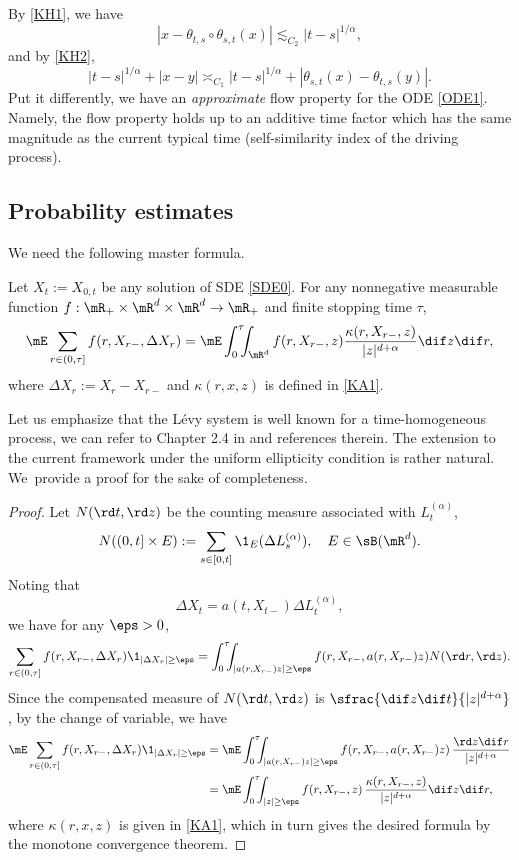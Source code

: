 \begin{remark}
By \eqref{KH1}, we have
\begin{equation*}%
|x-\theta_{t,s}\circ\theta_{s,t}(x)|\lesssim_{C_2} |t-s|^{1/\alpha},
\end{equation*}
and by \eqref{KH2},
\begin{equation}\label{KH22}
|t-s|^{1/\alpha}+|x-y|\asymp_{C_1}|t-s|^{1/\alpha}+|\theta_{s,t}(x)-\theta_{t,s}(y)|.
\end{equation}
Put it differently, we have an \textit{approximate} flow property for the ODE \eqref{ODE1}. Namely, the flow property holds up to an additive time factor which has the same magnitude as the current typical time (self-similarity index of the driving process).
\end{remark}
\subsection{Probability estimates}

We need the following master formula.
\begin{lemma}\label{Le24}
Let $X_t:=X_{0,t}$ be any solution of SDE \eqref{SDE0}.
For any nonnegative measurable function $f: \mR_+\times\mR^d\times\mR^d\to\mR_+$ and finite stopping time $\tau$,
\[
\mE\sum_{r\in(0,\tau]}f(r, X_{r-}, \Delta X_r)=\mE\int^\tau_0\!\!\!\int_{\mR^d}f(r, X_{r-}, z)\frac{\kappa(r,X_{r-},z)}{|z|^{d+\alpha}}\dif z\dif r,
\]
where $\Delta X_r:=X_r-X_{r-}$ and $\kappa(r,x,z)$ is defined in \eqref{KA1}.
\end{lemma}
Let us emphasize that the Lévy system is well known for a time-homogeneous process, we can \eg refer to Chapter 2.4 in \cite{bott:schi:wang:13} and references therein. The extension to the current framework under the uniform ellipticity condition is rather natural. We~provide a proof for the sake of completeness.
\begin{proof}
Let $N(\rd t,\rd z)$ be the counting measure associated with $L^{(\alpha)}_t$, \ie
\[
N((0,t]\times E):=\sum_{s\in[0,t]}\1_E(\Delta L^{(\alpha)}_s),\quad E\in\sB(\mR^d).
\]
Noting that
\[
\Delta X_t=a(t,X_{t-})\Delta L^{(\alpha)}_t,
\]
we have for any $\eps>0$,
\[
\sum_{r\in(0,\tau]}f(r, X_{r-}, \Delta X_r)
\1_{|\Delta X_r|\geq\eps}
=\int^\tau_0\!\!\!
\int_{|{a(r,X_{r-})z}|\geq\eps}
f(r, X_{r-}, a(r,X_{r-})z)
N(\rd r,\rd z).
\]
Since the compensated measure of $N(\rd t,\rd z)$ is $\sfrac{\dif z\dif t}{|z|^{d+\alpha}}$,
by the change of variable, we have
\begin{align*}
\mE\sum_{r\in(0,\tau]}f(r, X_{r-}, \Delta X_r)
\1_{|\Delta X_r|\geq\eps}
&=\mE\int^\tau_0\!\!\!
\int_{|{a(r,X_{r-})z}|\geq\eps}
f(r, X_{r-}, a(r,X_{r-})z)\,\frac{\rd z\dif r}{|z|^{d+\alpha}}
\\&=\mE\int^\tau_0\!\!\!\int_{|z|\geq\eps}f(r, X_{r-}, z)\,\frac{\kappa(r,X_{r-},z)}{|z|^{d+\alpha}}\dif z\dif r,
\end{align*}
where $\kappa(r,x,z)$ is given in \eqref{KA1},
which in turn gives the desired formula by the monotone convergence theorem.
\end{proof}

